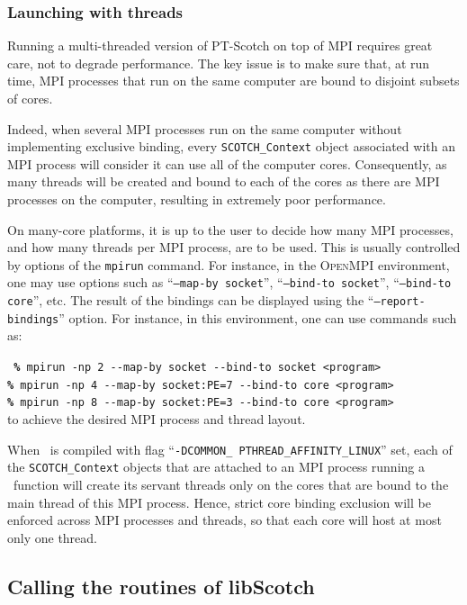 \subsubsection{Launching with threads}

Running a multi-threaded version of PT-Scotch on top of MPI requires
great care, not to degrade performance. The key issue is to make sure
that, at run time, MPI processes that run on the same computer are
bound to disjoint subsets of cores.

Indeed, when several MPI processes run on the same computer without
implementing exclusive binding, every \texttt{SCOTCH\_\lbt Context}
object associated with an MPI process will consider it can use all
of the computer cores. Consequently, as many threads will be created
and bound to each of the cores as there are MPI processes on the
computer, resulting in extremely poor performance.

On many-core platforms, it is up to the user to decide how many MPI
processes, and how many threads per MPI process, are to be used. This
is usually controlled by options of the \texttt{mpirun} command. For
instance, in the \textsc{OpenMPI} environment, one may use options
such as ``\texttt{--map-by socket}'', ``\texttt{--bind-to socket}'',
``\texttt{--bind-to core}'', etc. The result of the bindings can be
displayed using the ``\texttt{--report-bindings}'' option. For
instance, in this environment, one can use commands such as:

\noi
{\tt
{\bf\%} \verb+mpirun -np 2 --map-by socket --bind-to socket <program>+\\
{\bf\%} \verb+mpirun -np 4 --map-by socket:PE=7 --bind-to core <program>+\\
{\bf\%} \verb+mpirun -np 8 --map-by socket:PE=3 --bind-to core <program>+\\
}
\noi
to achieve the desired MPI process and thread layout.

When \scotch\ is compiled with flag ``\texttt{-DCOMMON\_\lbt
PTHREAD\_\lbt AFFINITY\_\lbt LINUX}'' set, each of the
\texttt{SCOTCH\_\lbt Context} objects that are attached to an MPI
process running a \libptscotch\ function will create its servant
threads only on the cores that are bound to the main thread of this
MPI process. Hence, strict core binding exclusion will be enforced
across MPI processes and threads, so that each core will host at most
only one thread.

\subsection{Calling the routines of {\sc libScotch}}

